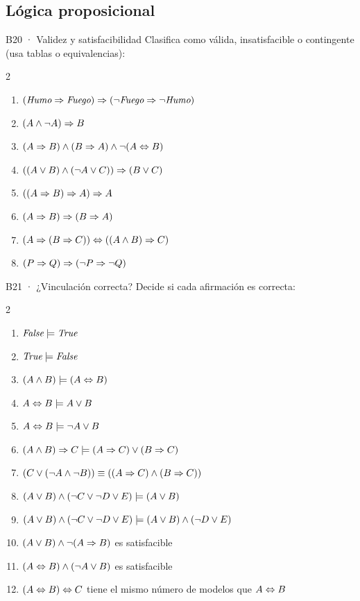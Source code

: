 \subsection{Lógica proposicional}

\begin{ejercicio}{B20 · Validez y satisfacibilidad }
Clasifica como válida, insatisfacible o contingente (usa tablas o equivalencias):
\begin{multicols}{2}
\begin{enumerate}[label=(\alph*)]
\item $(\textit{Humo}\Rightarrow\textit{Fuego})\Rightarrow(\neg\textit{Fuego}\Rightarrow\neg\textit{Humo})$
\item $(A\wedge\neg A)\Rightarrow B$
\item $(A\Rightarrow B)\wedge(B\Rightarrow A)\wedge\neg(A\Leftrightarrow B)$
\item $((A\vee B)\wedge(\neg A\vee C))\Rightarrow(B\vee C)$
\item $((A\Rightarrow B)\Rightarrow A)\Rightarrow A$
\item $(A\Rightarrow B)\Rightarrow(B\Rightarrow A)$
\item $(A\Rightarrow(B\Rightarrow C))\Leftrightarrow((A\wedge B)\Rightarrow C)$
\item $(P\Rightarrow Q)\Rightarrow(\neg P\Rightarrow\neg Q)$
\end{enumerate}
\end{multicols}
\end{ejercicio}

\begin{ejercicio}{B21 · ¿Vinculación correcta? }
Decide si cada afirmación es correcta:
\begin{multicols}{2}
\begin{enumerate}[label=(\alph*)]
\item $\textit{False}\models\textit{True}$
\item $\textit{True}\models\textit{False}$
\item $(A\wedge B)\models(A\Leftrightarrow B)$
\item $A\Leftrightarrow B\models A\vee B$
\item $A\Leftrightarrow B\models\neg A\vee B$
\item $(A\wedge B)\Rightarrow C\models(A\Rightarrow C)\vee(B\Rightarrow C)$
\item $(C\vee(\neg A\wedge\neg B))\equiv((A\Rightarrow C)\wedge(B\Rightarrow C))$
\item $(A\vee B)\wedge(\neg C\vee\neg D\vee E)\models(A\vee B)$
\item $(A\vee B)\wedge(\neg C\vee\neg D\vee E)\models(A\vee B)\wedge(\neg D\vee E)$
\item $(A\vee B)\wedge\neg(A\Rightarrow B)$ es satisfacible
\item $(A\Leftrightarrow B)\wedge(\neg A\vee B)$ es satisfacible
\item $(A\Leftrightarrow B)\Leftrightarrow C$ tiene el mismo número de modelos que $A\Leftrightarrow B$
\end{enumerate}
\end{multicols}
\end{ejercicio}

